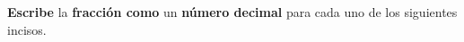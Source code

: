 \textbf{Escribe} la \textbf{fracción como} un \textbf{n\'umero decimal} para cada uno de los siguientes incisos.
\begin{multicols}{2}
    \begin{parts}


        
        
    \end{parts}
\end{multicols}
